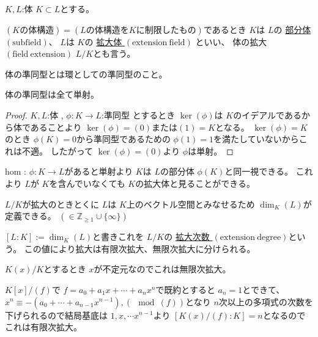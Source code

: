 \documentclass[../master_galois_theory]{subfiles}
\begin{document}
\begin{defi}
  $K , L$:体 $K \subset L$とする。

  $(Kの体構造) = (Lの体構造をKに制限したもの)$であるとき
  $K$は $L$の \underline{部分体 $(\mathrm{subfield})$}、
  $L$は $K$の \underline{拡大体 $(\mathrm{extension \  field})$}
  といい、
  体の拡大 $(\mathrm{field \  extension})$ $L/K$とも言う。

\end{defi}

\begin{defi}
  体の準同型とは環としての準同型のこと。
\end{defi}

\begin{note}
  体の準同型は全て単射。
\end{note}
\begin{proof}
  $K , L$:体 , $\phi : K \longrightarrow L$:準同型
  とするとき $\ker (\phi)$は $K$のイデアルであるから体であることより
  $\ker (\phi) = (0) または (1) = K$となる。
  $\ker (\phi) = K$のとき $\phi(K) = 0$から準同型であるための $\phi(1) = 1$を満たしていないからこれは不適。
  したがって $\ker (\phi) = (0)$より $\phi$は単射。
\end{proof}

  hom : $\phi : K \longrightarrow L$があると単射より $K$は $L$の部分体 $\phi(K)$と同一視できる。
  これより $L$が $K$を含んでいなくても $K$の拡大体と見ることができる。

  $L/K$が拡大のときとくに $L$は $K$上のベクトル空間とみなせるため $\dim_K(L)$が定義できる。 $(\in \mathbb{Z}_{\geq 1} \cup \{ \infty \})$

  \begin{defi}
    $[L:K] := \dim_K(L)$と書きこれを $L/K$の \underline{拡大次数 $(\mathrm{extension \  degree})$}という。
    この値により拡大は有限次拡大、無限次拡大に分けられる。
  \end{defi}

  \begin{exam}
    $K(x)/K$とするとき $x$が不定元なのでこれは無限次拡大。

    $K[x]/(f)$で $f = a_0 + a_1 x + \cdots + a_n x^n$で既約とすると
    $a_n = 1$とできて、 $x^n \equiv -(a_0 + \cdots + a_{n-1} x^{n-1}) , (\mod (f))$となり
    $n$次以上の多項式の次数を下げられるので結局基底は $1 , x , \cdots x^{n-1}$より $[K(x)/(f) : K] = n$となるのでこれは有限次拡大。
  \end{exam}
\end{document}
